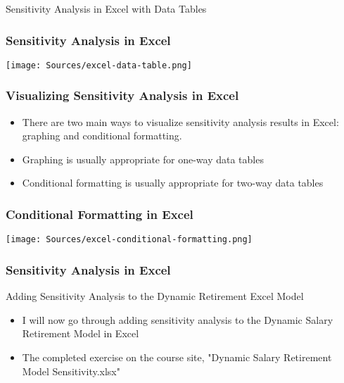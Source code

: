 \documentclass[handout, 11pt]{beamer}
\begin{document}
\begin{section}[SA Excel]{Sensitivity Analysis in Excel with Data Tables}
\begin{frame}
\frametitle{Sensitivity Analysis in Excel}
\begin{center}
\begin{adjustbox}{width=0.9\textwidth, height=0.8\textheight, keepaspectratio}
\texttt{[image: Sources/excel-data-table.png]}
\end{adjustbox}
\end{center}
\end{frame}
\begin{frame}
\frametitle{Visualizing Sensitivity Analysis in Excel}
\begin{itemize}
\item There are two main ways to visualize sensitivity analysis results in Excel: graphing and conditional formatting.
\vfill
\item Graphing is usually appropriate for one-way data tables
\vfill
\item Conditional formatting is usually appropriate for two-way data tables
\end{itemize}
\end{frame}
\begin{frame}
\frametitle{Conditional Formatting in Excel}
\begin{center}
\begin{adjustbox}{width=0.9\textwidth, height=0.8\textheight, keepaspectratio}
\texttt{[image: Sources/excel-conditional-formatting.png]}
\end{adjustbox}
\end{center}
\end{frame}
\begin{frame}
\frametitle{Sensitivity Analysis in Excel}
{
\begin{block}{Adding Sensitivity Analysis to the Dynamic Retirement Excel Model}
\begin{itemize}
\item I will now go through adding sensitivity analysis to the Dynamic Salary Retirement Model in Excel
\item The completed exercise on the course site, "Dynamic Salary Retirement Model Sensitivity.xlsx"
\end{itemize}
\end{block}
}
\end{frame}
\begin{frame}

\end{frame}
\end{section}
\end{document}
